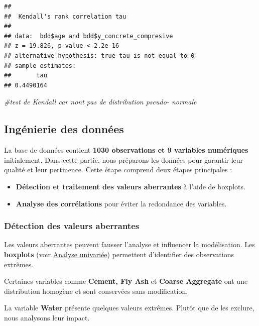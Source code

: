 \documentclass[
  12pt,
]{article}
\newenvironment{Shaded}{\begin{snugshade}}{\end{snugshade}}
\newcommand{\CommentTok}[1]{\textcolor[rgb]{0.56,0.35,0.01}{\textit{#1}}}
\providecommand{\tightlist}{%
  \setlength{\itemsep}{0pt}\setlength{\parskip}{0pt}}
\begin{document}
\begin{verbatim}
## 
##  Kendall's rank correlation tau
## 
## data:  bdd$age and bdd$y_concrete_compresive
## z = 19.826, p-value < 2.2e-16
## alternative hypothesis: true tau is not equal to 0
## sample estimates:
##       tau 
## 0.4490164
\end{verbatim}

\begin{Shaded}
\begin{Highlighting}[]
\CommentTok{\#test de Kendall car n\textquotesingle{}ont pas de distribution pseudo{-} normale}
\end{Highlighting}
\end{Shaded}

\subsection{Ingénierie des données}\label{inguxe9nierie-des-donnuxe9es}

La base de données contient \textbf{1030 observations et 9 variables
numériques} initialement. Dans cette partie, nous préparons les données
pour garantir leur qualité et leur pertinence. Cette étape comprend deux
étapes principales :

\begin{itemize}
\tightlist
\item
  \textbf{Détection et traitement des valeurs aberrantes} à l'aide de
  boxplots.\\
\item
  \textbf{Analyse des corrélations} pour éviter la redondance des
  variables.
\end{itemize}

\subsubsection{Détection des valeurs
aberrantes}\label{duxe9tection-des-valeurs-aberrantes}

Les valeurs aberrantes peuvent fausser l'analyse et influencer la
modélisation. Les \textbf{boxplots} (voir
\hyperref[duxe9tection-des-valeurs-aberrantes-boxplots]{Analyse
univariée}) permettent d'identifier des observations extrêmes.

Certaines variables comme \textbf{Cement, Fly Ash} et \textbf{Coarse
Aggregate} ont une distribution homogène et sont conservées sans
modification.

La variable \textbf{Water} présente quelques valeurs extrêmes. Plutôt
que de les exclure, nous analysons leur impact.
\end{document}
